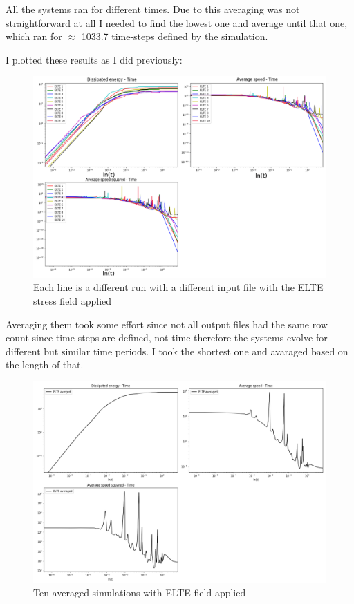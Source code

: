 \documentclass[12pt,a4paper]{article}
\theoremstyle{plain}
\begin{document}
\begin{multicols*}{2}
	\par All the systems ran for different times. Due to this averaging was not straightforward
	at all I needed to find the lowest one and average until that one, which ran for $\approx$ 1033.7
	time-steps defined by the simulation.

	\par I plotted these results as I did previously:

	\begin{figure}[H]
		\centering
		\includegraphics[width=0.95\columnwidth]{all_elte.png}
		\caption{Each line is a different run with a different input file with the ELTE stress field applied}
	\end{figure}

	\par Averaging them took some effort since not all output files had the same row count since
	time-steps are defined, not time therefore the systems evolve for different but similar
	time periods. I took the shortest one and avaraged based on the length of that.

	\begin{figure}[H]
		\centering
		\includegraphics[width=0.99\columnwidth]{all_elte_averaged.png}
		\caption{Ten averaged simulations with ELTE field applied}
		\label{fig:avg}
	\end{figure}


\end{multicols*}
\end{document}
